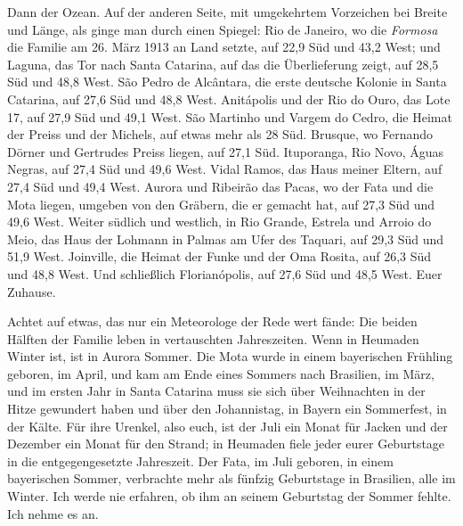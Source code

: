 \documentclass[
  ngerman,
  11pt,
  openany]{book}
\begin{document}
Dann der Ozean. Auf der anderen Seite, mit umgekehrtem Vorzeichen bei
Breite und Länge, als ginge man durch einen Spiegel: Rio de Janeiro, wo
die \emph{Formosa} die Familie am 26. März 1913 an Land setzte, auf 22,9
Süd und 43,2 West; und Laguna, das Tor nach Santa Catarina, auf das die
Überlieferung zeigt, auf 28,5 Süd und 48,8 West. São Pedro de Alcântara,
die erste deutsche Kolonie in Santa Catarina, auf 27,6 Süd und 48,8
West. Anitápolis und der Rio do Ouro, das Lote 17, auf 27,9 Süd und 49,1
West. São Martinho und Vargem do Cedro, die Heimat der Preiss und der
Michels, auf etwas mehr als 28 Süd. Brusque, wo Fernando Dörner und
Gertrudes Preiss liegen, auf 27,1 Süd. Ituporanga, Rio Novo, Águas
Negras, auf 27,4 Süd und 49,6 West. Vidal Ramos, das Haus meiner Eltern,
auf 27,4 Süd und 49,4 West. Aurora und Ribeirão das Pacas, wo der Fata
und die Mota liegen, umgeben von den Gräbern, die er gemacht hat, auf
27,3 Süd und 49,6 West. Weiter südlich und westlich, in Rio Grande,
Estrela und Arroio do Meio, das Haus der Lohmann in Palmas am Ufer des
Taquari, auf 29,3 Süd und 51,9 West. Joinville, die Heimat der Funke und
der Oma Rosita, auf 26,3 Süd und 48,8 West. Und schließlich
Florianópolis, auf 27,6 Süd und 48,5 West. Euer Zuhause.

Achtet auf etwas, das nur ein Meteorologe der Rede wert fände: Die
beiden Hälften der Familie leben in vertauschten Jahreszeiten. Wenn in
Heumaden Winter ist, ist in Aurora Sommer. Die Mota wurde in einem
bayerischen Frühling geboren, im April, und kam am Ende eines Sommers
nach Brasilien, im März, und im ersten Jahr in Santa Catarina muss sie
sich über Weihnachten in der Hitze gewundert haben und über den
Johannistag, in Bayern ein Sommerfest, in der Kälte. Für ihre Urenkel,
also euch, ist der Juli ein Monat für Jacken und der Dezember ein Monat
für den Strand; in Heumaden fiele jeder eurer Geburtstage in die
entgegengesetzte Jahreszeit. Der Fata, im Juli geboren, in einem
bayerischen Sommer, verbrachte mehr als fünfzig Geburtstage in
Brasilien, alle im Winter. Ich werde nie erfahren, ob ihm an seinem
Geburtstag der Sommer fehlte. Ich nehme es an.
\end{document}
